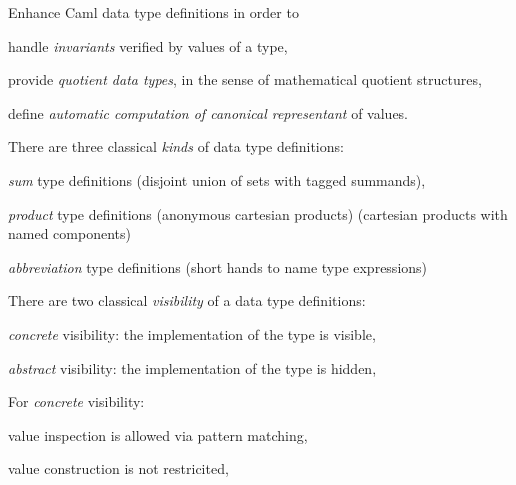 \def\adviheader{\relax}


Enhance Caml data type definitions in order to

\begin{citemize}
\item handle {\em invariants} verified by values of a type,

\item provide {\em quotient data types}, in the sense of mathematical quotient
  structures,

\item define {\em automatic computation of canonical representant} of values.
\end{citemize}


There are three classical {\em kinds} of data type definitions:
\begin{citemize}
\item {\em sum} type definitions
 (disjoint union of sets with tagged summands),

\item {\em product} type definitions
 (anonymous cartesian products)
 (cartesian products with named components)

\item {\em abbreviation} type definitions
 (short hands to name type expressions)
\end{citemize}


There are two classical {\em visibility} of a data type definitions:

\begin{citemize}

\item {\em concrete} visibility: the implementation of the type is visible,

\item {\em abstract} visibility: the implementation of the type is hidden,
\end{citemize}


For {\em concrete} visibility:

\begin{citemize}
\item value inspection is allowed via pattern matching,
\item value construction is not restricited,
\end{citemize}

